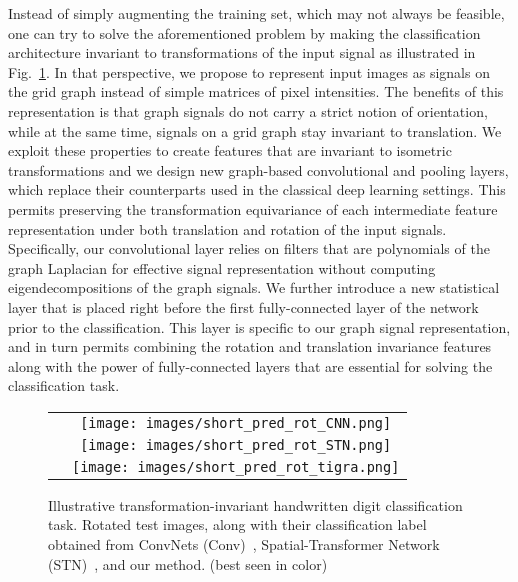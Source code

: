 \documentclass[10pt,journal,compsoc]{IEEEtran}
\begin{document}
	Instead of simply augmenting the training set, which may not always be feasible, one can try to solve the aforementioned problem by making the classification architecture invariant to transformations of the input signal as illustrated in Fig.~\ref{fig:adv}. In that perspective, we propose to represent input images as signals on the grid graph instead of simple matrices of pixel intensities. The benefits of this representation is that graph signals do not carry a strict notion of orientation, while at the same time, signals on a grid graph stay invariant to translation. We exploit these properties to create features that are invariant to isometric transformations and we design new graph-based convolutional and pooling layers, which replace their counterparts used in the classical deep learning settings. This permits preserving the transformation equivariance of each intermediate feature representation under both translation and rotation of the input signals. Specifically, our convolutional layer relies on filters that are polynomials of the graph Laplacian for effective signal representation without computing eigendecompositions of the graph signals. We further introduce a new statistical layer that is placed right before the first fully-connected layer of the network prior to the classification. This layer is specific to our graph signal representation, and in turn permits combining the rotation and translation invariance features along with the power of fully-connected layers that are essential for solving the classification task.
	\begin{figure}
		\centering
		\begin{tabular}{cc}
			\raisebox{0.2cm}{\rotatebox{90}{Conv}} &
			\texttt{[image: images/short\_pred\_rot\_CNN.png]} \\
			\raisebox{0.2cm}{\rotatebox{90}{STN}} &
			\texttt{[image: images/short\_pred\_rot\_STN.png]} \\
			\raisebox{0.cm}{\rotatebox{90}{TIGraNet}} &
			\texttt{[image: images/short\_pred\_rot\_tigra.png]} \\
		\end{tabular}
		\caption{Illustrative transformation-invariant handwritten digit classification task. Rotated test images, along with their classification label obtained from ConvNets (Conv)~\cite{bb:lecun}, Spatial-Transformer Network (STN)~\cite{bb:STN}, and our method. (best seen in color)}
		\label{fig:adv}
	\end{figure}
\end{document}
